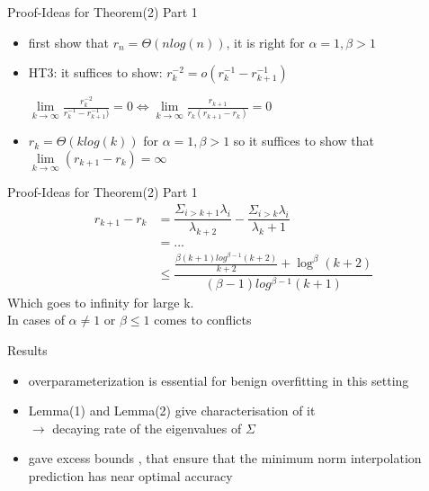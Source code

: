 \documentclass{beamer}
\begin{document}
\begin{frame}{Proof-Ideas for Theorem(2) Part 1}
\begin{itemize}
	\item first show that $r_n = \Theta(nlog(n))$, it is right for $\alpha = 1, \beta >1$
	\item HT3: it suffices to show: $r_k^{-2} = o(r_k^{-1} - r_{k+1}^{-1})$
	\begin{center}
		$\lim\limits_{k \rightarrow \infty}\frac{r_{k}^{-2}}{r_k^{-1} - r_{k+1}^{-1})} = 0 \Leftrightarrow \lim\limits_{k \rightarrow \infty}\frac{r_{k+1}}{r_k(r_{k+1} -r_k)} = 0$
	\end{center}
    \item $r_k = \Theta(klog(k))$ for $\alpha =1, \beta >1$ so it suffices to show that \hspace*{3.5cm}$\lim\limits_{k \rightarrow \infty}(r_{k+1} - r_k) = \infty $
\end{itemize}
\end{frame}

\begin{frame}{Proof-Ideas for Theorem(2) Part 1}
\begin{align*}
r_{k+1} - r_k & = \dfrac{\Sigma_{i>k+1}\lambda_i}{\lambda_{k+2}} - \dfrac{\Sigma_{i>k}\lambda_i}{\lambda_k+1}\\
& = ...\\
& \leq \dfrac{\frac{\beta(k+1)log^{\beta-1}(k+2)}{k+2} + \log^\beta(k+2)}{(\beta-1)log^{\beta-1}(k+1)}
\end{align*}
Which goes to infinity for large k.\\
In cases of $\alpha \neq 1$ or $\beta \leq 1$ comes to conflicts
\end{frame}



\begin{frame}{Results}
\begin{center}
\begin{itemize}
	\item overparameterization is essential for benign overfitting in this setting
	\item Lemma(1) and Lemma(2) give characterisation of it\\
	$\rightarrow$ decaying rate of the eigenvalues of $\Sigma$
	\item  gave excess bounds , that ensure that the minimum norm interpolation prediction has near optimal accuracy
\end{itemize}
\end{center}
\end{frame}
\end{document}
